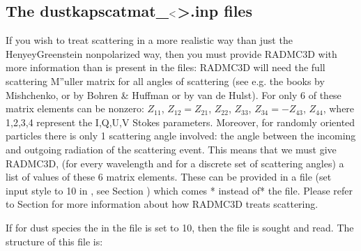 \documentclass[letterpaper,10pt,english]{sphinxmanual}
\begin{document}
\subsection{The {\color{red}\bfseries{}dustkapscatmat\_}\protect\(<\protect\)\textgreater{}\textasciigrave{}.inp files}
\label{\detokenize{inputoutputfiles:the-dustkapscatmat-inp-files}}\label{\detokenize{inputoutputfiles:sec-dustkapscatmat-files}}
If you wish to treat scattering in a more realistic way than just the
Henyey\sphinxhyphen{}Greenstein non\sphinxhyphen{}polarized way, then you must provide RADMC\sphinxhyphen{}3D with
more information than is present in the 
files: RADMC\sphinxhyphen{}3D will need the full scattering M”uller matrix for all angles
of scattering (see e.g. the books by Mishchenko, or by Bohren \& Huffman or
by van de Hulst). For  only 6 of these
matrix elements can be non\sphinxhyphen{}zero: \(Z_{11}\), \(Z_{12}=Z_{21}\), \(Z_{22}\),
\(Z_{33}\), \(Z_{34}=-Z_{43}\), \(Z_{44}\), where 1,2,3,4 represent the I,Q,U,V
Stokes parameters. Moreover, for randomly oriented particles there is only 1
scattering angle involved: the angle between the incoming and outgoing
radiation of the scattering event. This means that we must give RADMC\sphinxhyphen{}3D,
(for every wavelength and for a discrete set of scattering angles) a list of
values of these 6 matrix elements. These can be provided in a file
 (set input style to 10 in , see Section {\hyperref[\detokenize{inputoutputfiles:sec-dustopac-inp-file}]{}}) which comes *  instead of* the  file. Please refer to
Section {\hyperref[\detokenize{dustradtrans:sec-scattering}]{}} for more information about how RADMC\sphinxhyphen{}3D treats
scattering.

If for dust species  the  in the
 file is set to 10, then the file
is sought and read. The structure of this file is:
\end{document}
